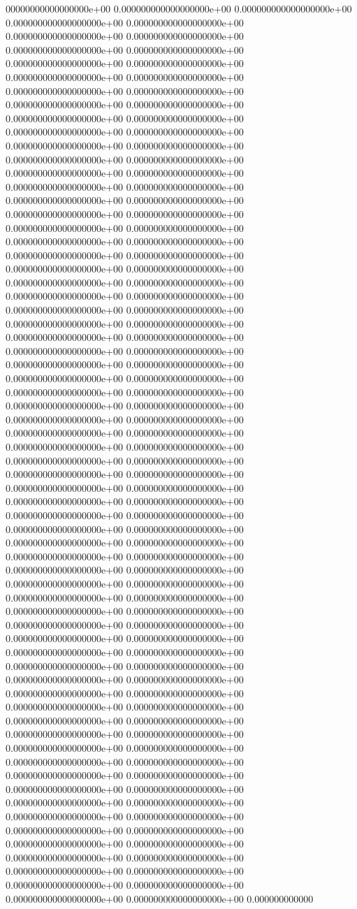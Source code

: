 00000000000000000e+00	0.000000000000000000e+00	0.000000000000000000e+00	0.000000000000000000e+00	0.000000000000000000e+00	0.000000000000000000e+00	0.000000000000000000e+00	0.000000000000000000e+00	0.000000000000000000e+00	0.000000000000000000e+00	0.000000000000000000e+00	0.000000000000000000e+00	0.000000000000000000e+00	0.000000000000000000e+00	0.000000000000000000e+00	0.000000000000000000e+00	0.000000000000000000e+00	0.000000000000000000e+00	0.000000000000000000e+00	0.000000000000000000e+00	0.000000000000000000e+00	0.000000000000000000e+00	0.000000000000000000e+00	0.000000000000000000e+00	0.000000000000000000e+00	0.000000000000000000e+00	0.000000000000000000e+00	0.000000000000000000e+00	0.000000000000000000e+00	0.000000000000000000e+00	0.000000000000000000e+00	0.000000000000000000e+00	0.000000000000000000e+00	0.000000000000000000e+00	0.000000000000000000e+00	0.000000000000000000e+00	0.000000000000000000e+00	0.000000000000000000e+00	0.000000000000000000e+00	0.000000000000000000e+00	0.000000000000000000e+00	0.000000000000000000e+00	0.000000000000000000e+00	0.000000000000000000e+00	0.000000000000000000e+00	0.000000000000000000e+00	0.000000000000000000e+00	0.000000000000000000e+00	0.000000000000000000e+00	0.000000000000000000e+00	0.000000000000000000e+00	0.000000000000000000e+00	0.000000000000000000e+00	0.000000000000000000e+00	0.000000000000000000e+00	0.000000000000000000e+00	0.000000000000000000e+00	0.000000000000000000e+00	0.000000000000000000e+00	0.000000000000000000e+00	0.000000000000000000e+00	0.000000000000000000e+00	0.000000000000000000e+00	0.000000000000000000e+00	0.000000000000000000e+00	0.000000000000000000e+00	0.000000000000000000e+00	0.000000000000000000e+00	0.000000000000000000e+00	0.000000000000000000e+00	0.000000000000000000e+00	0.000000000000000000e+00	0.000000000000000000e+00	0.000000000000000000e+00	0.000000000000000000e+00	0.000000000000000000e+00	0.000000000000000000e+00	0.000000000000000000e+00	0.000000000000000000e+00	0.000000000000000000e+00	0.000000000000000000e+00	0.000000000000000000e+00	0.000000000000000000e+00	0.000000000000000000e+00	0.000000000000000000e+00	0.000000000000000000e+00	0.000000000000000000e+00	0.000000000000000000e+00	0.000000000000000000e+00	0.000000000000000000e+00	0.000000000000000000e+00	0.000000000000000000e+00	0.000000000000000000e+00	0.000000000000000000e+00	0.000000000000000000e+00	0.000000000000000000e+00	0.000000000000000000e+00	0.000000000000000000e+00	0.000000000000000000e+00	0.000000000000000000e+00	0.000000000000000000e+00	0.000000000000000000e+00	0.000000000000000000e+00	0.000000000000000000e+00	0.000000000000000000e+00	0.000000000000000000e+00	0.000000000000000000e+00	0.000000000000000000e+00	0.000000000000000000e+00	0.000000000000000000e+00	0.000000000000000000e+00	0.000000000000000000e+00	0.000000000000000000e+00	0.000000000000000000e+00	0.000000000000000000e+00	0.000000000000000000e+00	0.000000000000000000e+00	0.000000000000000000e+00	0.000000000000000000e+00	0.000000000000000000e+00	0.000000000000000000e+00	0.000000000000000000e+00	0.000000000000000000e+00	0.000000000000000000e+00	0.000000000000000000e+00	0.000000000000000000e+00	0.000000000000000000e+00	0.000000000000000000e+00	0.000000000000000000e+00	0.000000000000000000e+00	0.000000000000000000e+00	0.000000000000000000e+00	0.000000000000000000e+00	0.000000000000